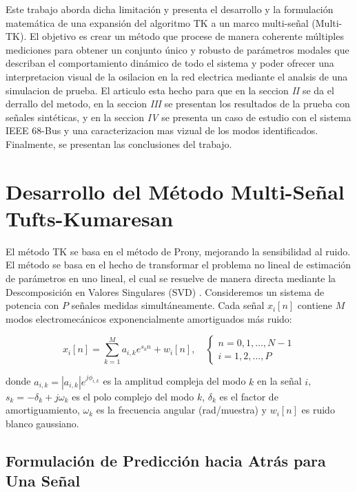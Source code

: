 \documentclass[conference]{IEEEtran}
\begin{document}
Este trabajo aborda dicha limitación y presenta el desarrollo y la formulación matemática de una expansión del algoritmo TK a un marco multi-señal (Multi-TK). El objetivo es crear un método que procese de manera coherente múltiples mediciones para obtener un conjunto único y robusto de parámetros modales que describan el comportamiento dinámico de todo el sistema y poder ofrecer una interpretacion visual de la osilacion en la red electrica mediante el analsis de una simulacion de prueba. El articulo esta hecho para que en la seccion \emph{II} se da el derrallo del metodo, en la seccion \emph{III} se presentan los resultados de la prueba con señales sintéticas, y en la seccion \emph{IV} se presenta un caso de estudio con el sistema IEEE 68-Bus y una caracterizacion mas vizual de los modos identificados. Finalmente, se presentan las conclusiones del trabajo.

\section{Desarrollo del Método Multi-Señal Tufts-Kumaresan}

El método TK se basa en el método de Prony, mejorando la sensibilidad al ruido. El método se basa en el hecho de transformar el problema no lineal de estimación de parámetros en uno lineal, el cual se resuelve de manera directa mediante la Descomposición en Valores Singulares (SVD) \cite{tufts} \cite{moghdam}. Consideremos un sistema de potencia con $P$ señales medidas simultáneamente. Cada señal $x_i[n]$ contiene $M$ modos electromecánicos exponencialmente amortiguados más ruido:

\begin{equation}
x_i[n] = \sum_{k=1}^{M} a_{i,k} e^{s_k n} + w_i[n], \quad 
\begin{cases}
n = 0,1,\ldots,N-1 \\
i = 1,2,\ldots,P
\end{cases}
\label{eq:signal_model}
\end{equation}

donde $a_{i,k} = |a_{i,k}| e^{j\phi_{i,k}}$ es la amplitud compleja del modo $k$ en la señal $i$, $s_k = -\delta_k + j\omega_k$ es el polo complejo del modo $k$, $\delta_k $ es el factor de amortiguamiento, $\omega_k$ es la frecuencia angular (rad/muestra) y $w_i[n]$ es ruido blanco gaussiano.

\subsection{Formulación de Predicción hacia Atrás para Una Señal}
\end{document}
